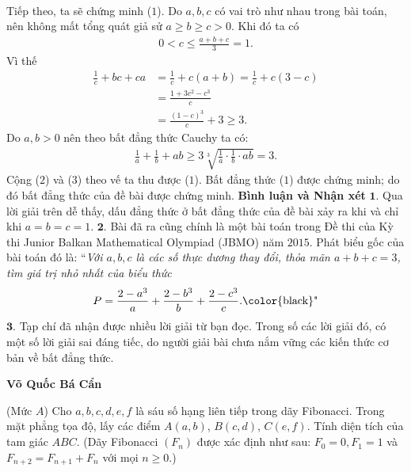 \begin{multicols}{2}
\begin{align*}
	\end{align*}
	Tiếp theo, ta sẽ chứng minh ($1$).
	\vskip 0.05cm
	Do $a, b, c$ có vai trò như nhau trong bài toán, nên không mất tổng quát giả sử $a\!\ge\! b\!\ge\! c \!>\!  0$.
	Khi đó ta có
	\begin{align*}
		0 < c \le \frac{{a + b + c}}{3} = 1.
	\end{align*}
	Vì thế
	\begin{align*}
		\frac{1}{c} \!+\! bc \!+\! ca &= \frac{1}{c} + c\left( {a + b} \right) = \frac{1}{c} + c\left( {3 - c} \right) \\[-0.5ex]
		&= \frac{{1 \!+\! 3{c^2}\! -\! {c^3}}}{c} \\
		&= \frac{{{{\left( {1 \!-\! c} \right)}^3}}}{c} \!+\! 3 \!\ge\! 3. \tag{$2$}
	\end{align*}
	Do $a, b >  0$ nên theo bất đẳng thức Cauchy ta có:
	\begin{align*}
		\frac{1}{a} + \frac{1}{b} + ab \ge 3\sqrt[3]{{\frac{1}{a} \cdot \frac{1}{b} \cdot ab}} = 3. \tag{$3$}
	\end{align*}
	Cộng ($2$) và ($3$) theo vế ta thu được ($1$).
	\vskip 0.05cm
	Bất đẳng thức ($1$) được chứng minh; do đó bất đẳng thức của đề bài được chứng minh.
	\vskip 0.05cm
	\textbf{\color{thachthuctoanhoc}Bình luận và Nhận xét}
	\vskip 0.05cm
	$\pmb{1.}$ Qua lời giải trên dễ thấy, dấu đẳng thức ở bất đẳng thức của đề bài xảy ra khi và chỉ khi $a=b=c= 1$.
	\vskip 0.05cm
	$\pmb{2.}$ Bài đã ra cũng chính là một bài toán trong Đề thi của Kỳ thi Junior Balkan Mathematical Olympiad (JBMO) năm $2015$. Phát biểu gốc của bài toán đó là:
	\vskip 0.05cm
	``\textit{Với $a, b, c$ là các số thực dương thay đổi, thỏa mãn $a+b+c= 3$, tìm giá trị nhỏ nhất của biểu thức}
	\begin{align*}
		P = \frac{{2 - {a^3}}}{a} + \frac{{2 - {b^3}}}{b} + \frac{{2 - {c^3}}}{c}.\text{\color{black}"}
	\end{align*}
	$\pmb{3.}$ Tạp chí đã nhận được nhiều lời giải từ bạn đọc. Trong số các lời giải đó, có một số lời giải sai đáng tiếc, do người giải bài chưa nắm vững các kiến thức cơ bản về bất đẳng thức.
	\begin{flushright}
		\textbf{\color{thachthuctoanhoc}Võ Quốc Bá Cẩn}
	\end{flushright}
	{}
	(Mức $A$) Cho $a, b, c, d, e, f$ là sáu số hạng liên tiếp trong dãy Fibonacci. Trong mặt phẳng tọa độ, lấy các điểm $A(a, b)$, $B(c, d)$, $C(e, f)$. Tính diện tích của tam giác $ABC$.
	\vskip 0.05cm
	(Dãy Fibonacci $(F_n)$  được xác định như sau: $F_0 = 0, F_1 = 1$  và $F_{n+2} = F_{n+1} + F_n$  với mọi $n\ge 0$.)

\end{multicols}
